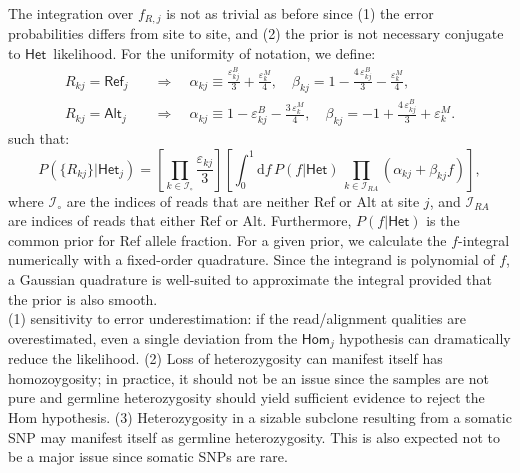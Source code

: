 \documentclass[nofootinbib,amssymb,amsmath]{revtex4}
\newcommand{\HET}{$\mathsf{Het}$}
\newcommand{\epss}{\varepsilon}
\begin{document}
The integration over $f_{R,j}$ is not as trivial as before since (1) the error probabilities differs from site to site, and (2) the prior is not necessary conjugate to \HET~likelihood. For the uniformity of notation, we define:
\begin{align}
R_{kj} = \mathsf{Ref}_j \quad &\Rightarrow \quad \alpha_{kj} \equiv \frac{\epss^B_{kj}}{3} + \frac{\epss^M_{k}}{4}, \quad \beta_{kj} = 1 - \frac{4\,\epss^B_{kj}}{3} - \frac{\epss^M_k}{4},\nonumber\\
R_{kj} = \mathsf{Alt}_j \quad &\Rightarrow \quad \alpha_{kj} \equiv 1 - \varepsilon^B_{kj} - \frac{3\,\epss^M_k}{4}, \quad \beta_{kj} = -1 + \frac{4 \, \epss^B_{kj}}{3} + \epss^M_k.
\end{align}
such that:
\begin{equation}\label{eq:Phet}
P(\{R_{kj}\}|\mathsf{Het}_j) = \left[\prod_{k \in \mathcal{I}_\circ} \frac{\varepsilon_{kj}}{3}\right]\left[\int_0^1 \mathrm{d} f \, P(f|\mathsf{Het})\, \prod_{k \in \mathcal{I}_{RA}}(\alpha_{kj} + \beta_{kj} f)\right],
\end{equation}
where $\mathcal{I}_\circ$ are the indices of reads that are neither Ref or Alt at site $j$, and $\mathcal{I}_{RA}$ are indices of reads that either Ref or Alt. Furthermore, $P(f|\mathsf{Het})$ is the common prior for Ref allele fraction. For a given prior, we calculate the $f$-integral numerically with a fixed-order quadrature. Since the integrand is polynomial of $f$, a Gaussian quadrature is well-suited to approximate the integral provided that the prior is also smooth.\\

 (1) sensitivity to error underestimation: if the read/alignment qualities are overestimated, even a single deviation from the $\mathsf{Hom}_j$ hypothesis can dramatically reduce the likelihood. (2) Loss of heterozygosity can manifest itself has homozoygosity; in practice, it should not be an issue since the samples are not pure and germline heterozygosity should yield sufficient evidence to reject the Hom hypothesis. (3) Heterozygosity in a sizable subclone resulting from a somatic SNP may manifest itself as germline heterozygosity. This is also expected not to be a major issue since somatic SNPs are rare.\\
\end{document}
